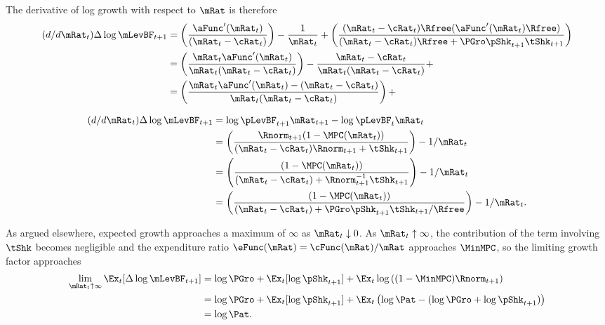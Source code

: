 \documentclass[\econtexRoot/BufferStockTheory]{subfiles}
\begin{document}
 The derivative of log growth with respect to $\mRat$ is therefore
\begin{equation}\begin{split}
    (d/d\mRat_{t}) \Delta \log \mLevBF_{t+1} &  = \left(\frac{\aFunc^{\prime}(\mRat_{t})}{(\mRat_{t}-\cRat_{t})}\right)-\frac{1}{\mRat_{t}}+\left(\frac{(\mRat_{t}-\cRat_{t})\Rfree(\aFunc^{\prime}(\mRat_{t})\Rfree)}{(\mRat_{t}-\cRat_{t})\Rfree+\PGro\pShk_{t+1}\tShk_{t+1}}\right)
\\  &  = \left(\frac{\mRat_{t}\aFunc^{\prime}(\mRat_{t})}{\mRat_{t}(\mRat_{t}-\cRat_{t})}\right)-\frac{\mRat_{t}-\cRat_{t}}{\mRat_{t}(\mRat_{t}-\cRat_{t})}+    
\\  &  = \left(\frac{\mRat_{t}\aFunc^{\prime}(\mRat_{t})-(\mRat_{t}-\cRat_{t})}{\mRat_{t}(\mRat_{t}-\cRat_{t})}\right)+
\end{split}\end{equation}

\begin{equation}\begin{split}
  (d/d\mRat_{t}) \Delta \log \mLevBF_{t+1} &  = \log \pLevBF_{t+1} \mRat_{t+1} - \log \pLevBF_{t} \mRat_{t} 
  \\   & = \left(\frac{\Rnorm_{t+1}(1-\MPC(\mRat_{t}))}{(\mRat_{t}-\cRat_{t})\Rnorm_{t+1}+\tShk_{t+1}}\right)-1/\mRat_{t}
  \\   & = \left(\frac{(1-\MPC(\mRat_{t}))}{(\mRat_{t}-\cRat_{t})+\Rnorm_{t+1}^{-1}\tShk_{t+1}}\right)-1/\mRat_{t}
\\   & = \left(\frac{(1-\MPC(\mRat_{t}))}{(\mRat_{t}-\cRat_{t})+\PGro\pShk_{t+1}\tShk_{t+1}/\Rfree}\right)-1/\mRat_{t}   . 
\end{split}\end{equation}


As argued elsewhere, expected growth approaches a maximum of $\infty$ as $\mRat_{t} \downarrow 0$.  As $\mRat_{t} \uparrow \infty$, the contribution of the term involving $\tShk$ becomes negligible and the expenditure ratio $\eFunc(\mRat)=\cFunc(\mRat)/\mRat$ approaches $\MinMPC$, so the limiting growth factor approaches
\begin{equation}\begin{split}
    \lim_{\mRat_{t} \uparrow \infty} \Ex_{t} [\Delta \log \mLevBF_{t+1}] & = \log \PGro + \Ex_{t}[\log \pShk_{t+1}] + \Ex_{t} \log \left((1-\MinMPC)\Rnorm_{t+1}\right)
    \\ & = \log \PGro + \Ex_{t}[\log \pShk_{t+1}] + \Ex_{t}\left( \log \Pat - (\log \PGro + \log \pShk_{t+1})\right)
    \\ & = \log \Pat.
\end{split}\end{equation}
\end{document}

